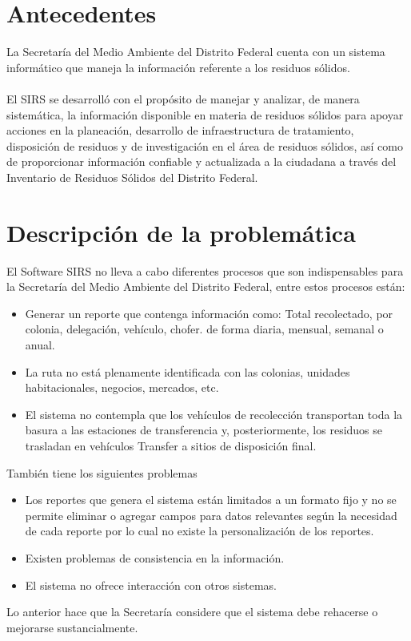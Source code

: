 

\section{Antecedentes}
La Secretaría del Medio Ambiente del Distrito Federal cuenta con un sistema informático que maneja la información referente a los residuos sólidos. 
\\\\
El SIRS se desarrolló con el propósito de manejar y analizar, de manera sistemática, la información disponible en materia de residuos sólidos para apoyar acciones en la planeación, desarrollo de infraestructura de tratamiento, disposición de residuos y de investigación en el área de residuos sólidos, así como de proporcionar información confiable y actualizada a la ciudadana a través del Inventario de Residuos Sólidos del Distrito Federal.





\section{Descripción de la problemática}
El Software SIRS no lleva a cabo diferentes procesos que son indispensables para la Secretaría del Medio Ambiente del Distrito Federal, entre estos procesos están:
\begin{itemize}
	\item Generar un reporte que contenga información como: Total recolectado, por colonia, delegación, vehículo, chofer. de forma diaria, mensual, semanal o anual.
	\item La ruta no está plenamente identificada con las colonias, unidades habitacionales, negocios, mercados, etc.
	\item El sistema no contempla que los vehículos de recolección transportan toda la basura a las estaciones de transferencia y, posteriormente, los residuos se trasladan en vehículos Transfer a sitios de disposición final.
\end{itemize}

También tiene los siguientes problemas

\begin{itemize}
	\item Los reportes que genera el sistema están limitados a un formato fijo y no se permite eliminar o agregar campos para datos relevantes  según la necesidad de cada reporte por lo cual no existe la  personalización de los reportes. 
	\item Existen problemas de consistencia en la información.
	\item El sistema no ofrece interacción con otros sistemas.
\end{itemize}
Lo anterior hace que la Secretaría considere que el sistema debe rehacerse o mejorarse sustancialmente.


